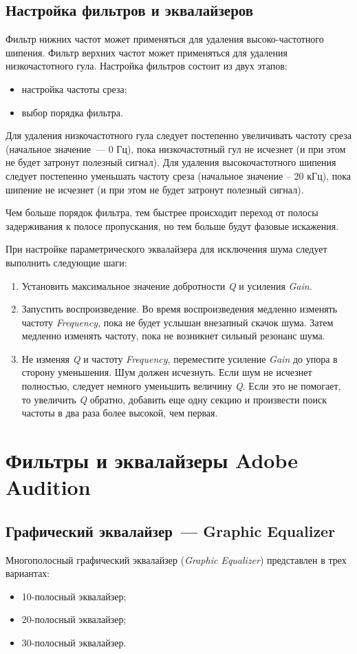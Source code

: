 \documentclass[oneside, final, 14pt]{extreport}
\begin{document}
\subsection{Настройка фильтров и эквалайзеров}
Фильтр нижних частот может применяться для удаления высоко-частотного шипения. Фильтр верхних частот может применяться для удаления низкочастотного гула. Настройка фильтров состоит из двух этапов:
\begin{itemize}
  \item настройка частоты среза;
  \item выбор порядка фильтра.
\end{itemize}
	
Для удаления низкочастотного гула следует постепенно увеличивать частоту среза (начальное значение~--- 0 Гц), пока низкочастотный гул не исчезнет (и при этом не будет затронут полезный сигнал). Для удаления высокочастотного шипения следует постепенно уменьшать частоту среза (начальное значение – 20 кГц), пока шипение не исчезнет (и при этом не будет затронут полезный сигнал).

Чем больше порядок фильтра, тем быстрее происходит переход от полосы задерживания к полосе пропускания, но тем больше будут фазовые искажения.

При настройке параметрического эквалайзера для исключения шума следует выполнить следующие шаги:
\begin{enumerate}
  \item Установить максимальное значение добротности \emph{Q} и усиления \emph{Gain}.
  \item Запустить воспроизведение. Во время воспроизведения медленно изменять частоту \emph{Frequency}, пока не будет услышан внезапный скачок шума. Затем медленно изменять частоту, пока не возникнет сильный резонанс шума.
  \item Не изменяя \emph{Q} и частоту \emph{Frequency}, переместите усиление \emph{Gain} до упора в сторону уменьшения. Шум должен исчезнуть. Если шум не исчезнет полностью, следует немного уменьшить величину \emph{Q}. Если это не помогает, то увеличить \emph{Q} обратно, добавить еще одну секцию и произвести поиск частоты в два раза более высокой, чем первая.
\end{enumerate}

\section{Фильтры и эквалайзеры Adobe Audition}
\subsection{Графический эквалайзер~--- Graphic Equalizer}
Многополосный графический эквалайзер (\emph{Graphic Equalizer}) представлен в трех вариантах:
\begin{itemize}
  \item 10-полосный эквалайзер;
  \item 20-полосный эквалайзер;
  \item 30-полосный эквалайзер.
\end{itemize}
\end{document}
